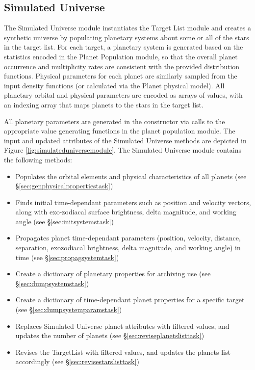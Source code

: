 \documentclass[cleanfoot]{asme2ej}
\newcommand{\reffig}[1]{Figure \ref{#1}}
\begin{document}
\subsection{Simulated Universe} \label{sec:simulateduniverse}
The Simulated Universe module instantiates the Target List module and creates a synthetic universe by populating planetary systems about some or all of the stars in the target list.  For each target, a planetary system is generated based on the statistics encoded in the Planet Population module, so that the overall planet occurrence and multiplicity rates are consistent with the provided distribution functions.  Physical parameters for each planet are similarly sampled from the input density functions (or calculated via the Planet physical model).  All planetary orbital and physical parameters are encoded as arrays of values, with an indexing array that maps planets to the stars in the target list. 

All planetary parameters are generated in the constructor via calls to the appropriate value generating functions in the planet population module. The input and updated attributes of the Simulated Universe methods are depicted in \reffig{fig:simulateduniversemodule}. The Simulated Universe module contains the following methods: 

\begin{itemize}[leftmargin=2in,font={\ttfamily}]
    \item[\texttt gen\_physical\_properties] Populates the orbital elements and physical characteristics of all planets (see \S\ref{sec:genphysicalpropertiestask})
    \item[\texttt init\_systems] Finds initial time-dependant parameters such as position and velocity vectors, along with exo-zodiacal surface brightness, delta magnitude, and working angle (see \S\ref{sec:initsystemstask}) 
    \item[\texttt propag\_system] Propagates planet time-dependant parameters (position, velocity, distance, separation, exozodiacal brightness, delta magnitude, and working angle) in time (see \S\ref{sec:propagsystemtask})
    \item[\texttt dump\_systems] Create a dictionary of planetary properties for archiving use (see \S\ref{sec:dumpsystemstask}) 
    \item[\texttt dump\_system\_params] Create a dictionary of time-dependant planet properties for a specific target (see \S\ref{sec:dumpsystemparamstask})
    \item[\texttt revise\_planets\_list] Replaces Simulated Universe planet attributes with filtered values, and updates the number of planets (see \S\ref{sec:reviseplanetslisttask})
    \item[\texttt revise\_stars\_list] Revises the TargetList with filtered values, and updates the planets list accordingly (see \S\ref{sec:revisestarslisttask})
\end{itemize}
\end{document}
